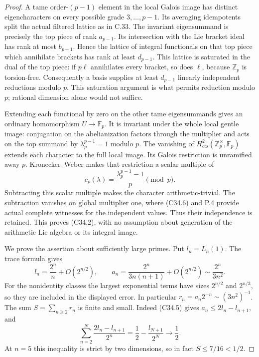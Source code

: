 \begin{proof}
A tame order-$(p-1)$ element in the local Galois image
has distinct eigencharacters on every possible grade
$3,\ldots,p-1$.  Its averaging idempotents split the
actual filtered lattice as in C.33.  The invariant
eigensummand is precisely the top piece of rank $a_{p-1}$.
Its intersection with the Lie bracket ideal has rank
at most $b_{p-1}$.  Hence the lattice of integral
functionals on that top piece which annihilate brackets
has rank at least $d_{p-1}$.
This lattice is saturated in the dual of the top piece:
if $p\ell$ annihilates every bracket, so does $\ell$,
because $\mathbb Z_p$ is torsion-free.
Consequently a basis supplies at least $d_{p-1}$
linearly independent reductions modulo $p$.
This saturation argument is what permits reduction
modulo $p$; rational dimension alone would not suffice.

Extending each functional by zero on the other tame
eigensummands gives an ordinary homomorphism
$U\to\mathbb F_p$.  It is invariant under the whole
local gentle image: conjugation on the abelianization
factors through the multiplier and acts on the top
summand by $\lambda_p^{p-1}=1$ modulo $p$.
The vanishing of
$H^2_{\mathrm{cts}}(\mathbb Z_p^\times,\mathbb F_p)$
extends each character to the full local image.
Its Galois restriction is unramified away $p$.
Kronecker--Weber makes that restriction a scalar multiple
of
\[
               c_p(\lambda)=
                    \frac{\lambda_p^{p-1}-1}{p}\pmod p .
                                                               \tag{C34.7}
\]
Subtracting this scalar multiple makes the character
arithmetic-trivial.  The subtraction vanishes on
global multiplier one, where (C34.6) and P.4 provide
actual complete witnesses for the independent values.
Thus their independence is retained.  This proves
(C34.2), with no assumption about generation of the
arithmetic Lie algebra or its integral image.

We prove the assertion about sufficiently large primes.
Put $l_n=L_n(1)$.  The trace formula gives
\[
 l_n=\frac{2^n}{n}+O(2^{n/2}),\qquad
 a_n=\frac{2^n}{3n(n+1)}+O(2^{n/2})
          \sim\frac{2^n}{3n^2}.                                \tag{C34.8}
\]
For the nonidentity classes the largest exponential
terms have sizes $2^{n/2}$ and $2^{n/3}$, so they are
included in the displayed error.
In particular $r_n=a_n2^{-n}\sim(3n^2)^{-1}$.
The sum $S=\sum_{n\geq2}r_n$ is finite and small.
Indeed (C34.5) gives $a_n\leq2l_n-l_{n+1}$, and
\[
 \sum_{n=2}^{N}\frac{2l_n-l_{n+1}}{2^n}
              =\frac12-\frac{l_{N+1}}{2^N}
                 \longrightarrow\frac12.
                                                               \tag{C34.9}
\]
At $n=5$ this inequality is strict by two dimensions,
so in fact $S\leq7/16<1/2$.


\end{proof}
